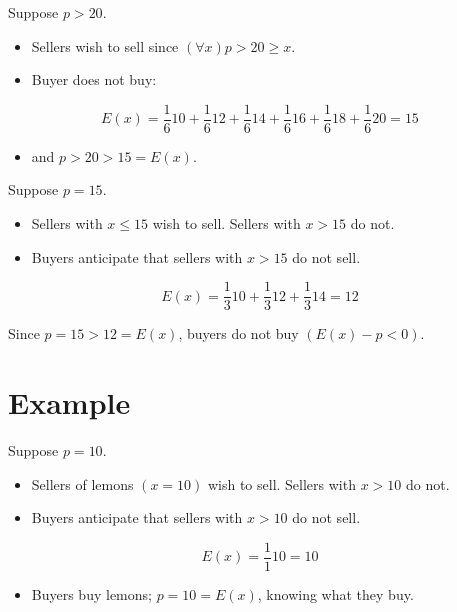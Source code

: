 \documentclass[10pt]{article}
\begin{document}
Suppose $p>20$.

\begin{itemize}
  \item Sellers wish to sell since $(\forall x) p>20 \geq x$.
  \item Buyer does not buy:
\end{itemize}

$$
E(x)=\frac{1}{6} 10+\frac{1}{6} 12+\frac{1}{6} 14+\frac{1}{6} 16+\frac{1}{6} 18+\frac{1}{6} 20=15
$$

\begin{itemize}
  \item and $p>20>15=E(x)$.
\end{itemize}

Suppose $p=15$.

\begin{itemize}
  \item Sellers with $x \leq 15$ wish to sell. Sellers with $x>15$ do not.
  \item Buyers anticipate that sellers with $x>15$ do not sell.
\end{itemize}

$$
E(x)=\frac{1}{3} 10+\frac{1}{3} 12+\frac{1}{3} 14=12
$$

Since $p=15>12=E(x)$, buyers do not buy $(E(x)-p<0)$.

\section*{Example}
Suppose $p=10$.

\begin{itemize}
  \item Sellers of lemons $(x=10)$ wish to sell. Sellers with $x>10$ do not.
  \item Buyers anticipate that sellers with $x>10$ do not sell.
\end{itemize}

$$
E(x)=\frac{1}{1} 10=10
$$

\begin{itemize}
  \item Buyers buy lemons; $p=10=E(x)$, knowing what they buy.
\end{itemize}
\end{document}
